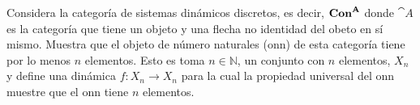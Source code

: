 \begin{exercise}[par=3]
  Considera la categoría de sistemas dinámicos discretos, es decir,
  \(\mathbf{Con}^{\mathbf{A}}\) donde \(\cat{A}\) es la categoría que tiene un objeto y una
  flecha no identidad del obeto en sí mismo. Muestra que el objeto de número
  naturales (onn) de esta categoría tiene por lo menos \(n\) elementos. Esto es toma
  \(n\in\mathbb{N}\), un conjunto con \(n\) elementos, \(X_n\) y define una
  dinámica \(f\colon X_n\to X_n\) para la cual la propiedad universal del onn
  muestre que el onn tiene \(n\) elementos. 
\end{exercise}